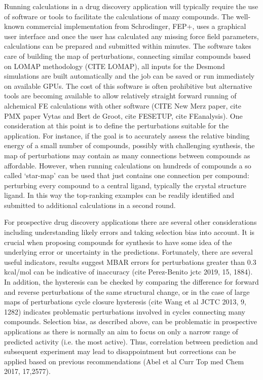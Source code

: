 \documentclass[9pt,bestpractices]{livecoms}
\begin{document}
Running calculations in a drug discovery application will typically require the use of software or tools to facilitate the calculations of many compounds. The well-known commercial implementation from Schrodinger, FEP+, uses a graphical user interface and once the user has calculated any missing force field parameters, calculations can be prepared and submitted within minutes. The software takes care of building the map of perturbations, connecting similar compounds based on LOMAP methodology (CITE LOMAP), all inputs for the Desmond simulations are built automatically and the job can be saved or run immediately on available GPUs. The cost of this software is often prohibitive but alternative tools are becoming available to allow relatively straight forward running of alchemical FE calculations with other software (CITE New Merz paper, cite PMX paper Vytas and Bert de Groot, cite FESETUP, cite FEanalysis). One consideration at this point is to define the perturbations suitable for the application. For instance, if the goal is to accurately assess the relative binding energy of a small number of compounds, possibly with challenging synthesis, the map of perturbations may contain as many connections between compounds as affordable. However, when running calculations on hundreds of compounds a so called ‘star-map’ can be used that just contains one connection per compound: perturbing every compound to a central ligand, typically the crystal structure ligand. In this way the top-ranking examples can be readily identified and submitted to additional calculations in a second round. 
%

For prospective drug discovery applications there are several other considerations including understanding likely errors and taking selection bias into account. It is crucial when proposing compounds for synthesis to have some idea of the underlying error or uncertainty in the predictions. Fortunately, there are several useful indicators, results suggest MBAR errors for perturbations greater than 0.3 kcal/mol can be indicative of inaccuracy (cite Perez-Benito jctc 2019, 15, 1884). In addition, the hysteresis can be checked by comparing the difference for forward and reverse perturbations of the same structural change, or in the case of large maps of perturbations cycle closure hysteresis (cite Wang et al JCTC 2013, 9, 1282) indicates problematic perturbations involved in cycles connecting many compounds. Selection bias, as described above, can be problematic in prospective applications as there is normally an aim to focus on only a narrow range of predicted activity (i.e. the most active). Thus, correlation between prediction and subsequent experiment may lead to disappointment but corrections can be applied based on previous recommendations (Abel et al Curr Top med Chem 2017, 17,2577). 
%
\end{document}
